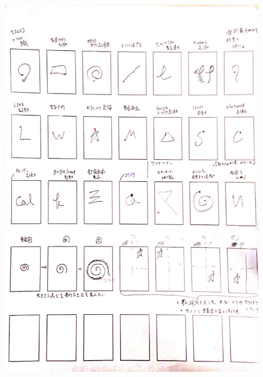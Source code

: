 \begin{figure} [p]
 \begin{center}
  \includegraphics [width=1.0\columnwidth]{img/P4.eps}
  \label{fig:elicitation_example}
 \end{center}
\end{figure}

